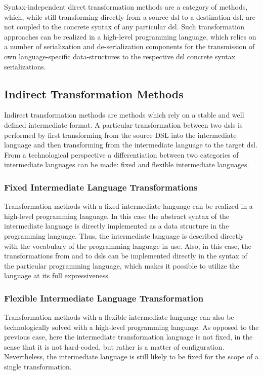 Syntax-independent direct transformation methods are a category of methods, which, while still transforming directly from a source \gls{dsl} to a destination \gls{dsl}, are not coupled to the concrete syntax of any particular \gls{dsl}. Such transformation approaches can be realized in a high-level programming language, which relies on a number of serialization and de-serialization components for the transmission of own language-specific data-structures to the respective \gls{dsl} concrete syntax serializations.

\subsection{Indirect Transformation Methods}

Indirect transformation methods are methods which rely on a stable and well defined intermediate format. A particular transformation between two \glspl{dsl} is performed by first transforming from the source DSL into the intermediate language and then transforming from the intermediate language to the target \gls{dsl}. From a technological perspective a differentiation between two categories of intermediate languages can be made: fixed and flexible intermediate languages.

\subsubsection{Fixed Intermediate Language Transformations}

Transformation methods with a fixed intermediate language can be realized in a high-level programming language. In this case the abstract syntax of the intermediate language is directly implemented as a data structure in the programming language. Thus, the intermediate language is described directly with the vocabulary of the programming language in use. Also, in this case, the transformations from and to \glspl{dsl} can be implemented directly in the syntax of the particular programming language, which makes it possible to utilize the language at its full expressiveness.

\subsubsection{Flexible Intermediate Language Transformation}

Transformation methods with a flexible intermediate language can also be technologically solved with a high-level programming language. As opposed to the previous case, here the intermediate transformation language is not fixed, in the sense that it is not hard-coded, but rather is a matter of configuration. Nevertheless, the intermediate language is still likely to be fixed for the scope of a single transformation.

